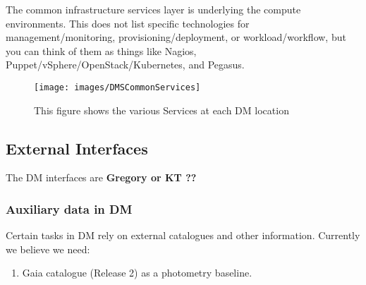 The common infrastructure services layer is underlying the compute environments. 
This does not list  specific technologies for management/monitoring,
provisioning/deployment, or workload/workflow, but you can think of them
as things like Nagios, Puppet/vSphere/OpenStack/Kubernetes, and Pegasus.

\begin{figure}[htbp]
\begin{center}
 \texttt{[image: images/DMSCommonServices]}
\caption{This figure shows the various Services at each DM location \label{fig:dcs}}
\end{center}
\end{figure}



\subsection{External Interfaces}
The DM interfaces are {\bf Gregory or KT ??}
\subsubsection{Auxiliary data in DM}
Certain tasks in DM rely on external catalogues and other information. Currently we believe we need:
\begin{enumerate}
		        \item Gaia catalogue (Release 2) as a photometry baseline.
		\end{enumerate}
